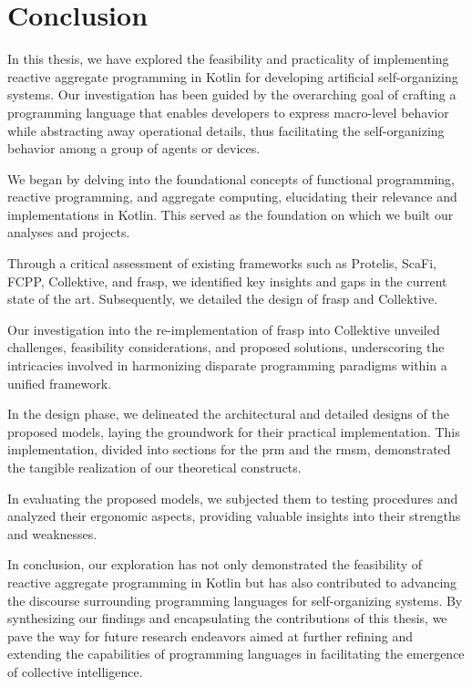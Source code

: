 
\chapter{Conclusion}
\label{chap:conclusion}

In this thesis, we have explored the feasibility and practicality of implementing reactive aggregate programming in Kotlin for developing artificial self-organizing systems. Our investigation has been guided by the overarching goal of crafting a programming language that enables developers to express macro-level behavior while abstracting away operational details, thus facilitating the self-organizing behavior among a group of agents or devices.

We began by delving into the foundational concepts of functional programming, reactive programming, and aggregate computing, elucidating their relevance and implementations in Kotlin. This served as the foundation on which we built our analyses and projects.

Through a critical assessment of existing frameworks such as Protelis, ScaFi, FCPP, Collektive, and \ac{frasp}, we identified key insights and gaps in the current state of the art. Subsequently, we detailed the design of \ac{frasp} and Collektive.

Our investigation into the re-implementation of \ac{frasp} into Collektive unveiled challenges, feasibility considerations, and proposed solutions, underscoring the intricacies involved in harmonizing disparate programming paradigms within a unified framework.

In the design phase, we delineated the architectural and detailed designs of the proposed models, laying the groundwork for their practical implementation. This implementation, divided into sections for the \ac{prm} and the \ac{rmsm}, demonstrated the tangible realization of our theoretical constructs.

In evaluating the proposed models, we subjected them to testing procedures and analyzed their ergonomic aspects, providing valuable insights into their strengths and weaknesses.

In conclusion, our exploration has not only demonstrated the feasibility of reactive aggregate programming in Kotlin but has also contributed to advancing the discourse surrounding programming languages for self-organizing systems. By synthesizing our findings and encapsulating the contributions of this thesis, we pave the way for future research endeavors aimed at further refining and extending the capabilities of programming languages in facilitating the emergence of collective intelligence.


